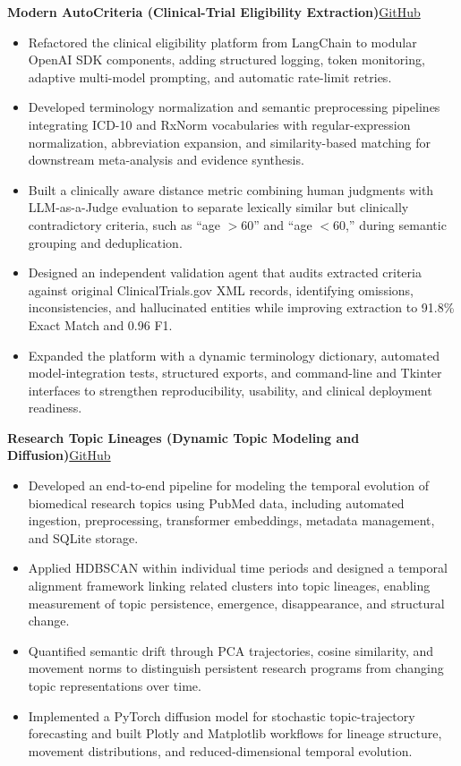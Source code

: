 \documentclass[11pt]{article}
\newcommand{\projectentry}[2]{%
  \Needspace{8\baselineskip}%
  \textbf{#1}\hfill #2\\[-8pt]%
}
\newenvironment{tightitemize}{%
  \vspace{-2pt}%
  \begin{itemize}[leftmargin=*,topsep=0pt,itemsep=1pt,parsep=0pt,partopsep=0pt]
}{%
  \end{itemize}\vspace{4pt}
}
\begin{document}
\projectentry
{Modern AutoCriteria (Clinical-Trial Eligibility Extraction)}
{\href{https://github.com/JonathanMa03/modern-autocrit}{GitHub}}
\begin{tightitemize}
\item Refactored the clinical eligibility platform from LangChain to modular OpenAI SDK components, adding structured logging, token monitoring, adaptive multi-model prompting, and automatic rate-limit retries.
\item Developed terminology normalization and semantic preprocessing pipelines integrating ICD-10 and RxNorm vocabularies with regular-expression normalization, abbreviation expansion, and similarity-based matching for downstream meta-analysis and evidence synthesis.
\item Built a clinically aware distance metric combining human judgments with LLM-as-a-Judge evaluation to separate lexically similar but clinically contradictory criteria, such as ``age $>60$'' and ``age $<60$,'' during semantic grouping and deduplication.
\item Designed an independent validation agent that audits extracted criteria against original ClinicalTrials.gov XML records, identifying omissions, inconsistencies, and hallucinated entities while improving extraction to 91.8\% Exact Match and 0.96 F1.
\item Expanded the platform with a dynamic terminology dictionary, automated model-integration tests, structured exports, and command-line and Tkinter interfaces to strengthen reproducibility, usability, and clinical deployment readiness.
\end{tightitemize}

\projectentry
{Research Topic Lineages (Dynamic Topic Modeling and Diffusion)}
{\href{https://github.com/JonathanMa03/diffusion-topic-evaluation}{GitHub}}
\begin{tightitemize}
\item Developed an end-to-end pipeline for modeling the temporal evolution of biomedical research topics using PubMed data, including automated ingestion, preprocessing, transformer embeddings, metadata management, and SQLite storage.
\item Applied HDBSCAN within individual time periods and designed a temporal alignment framework linking related clusters into topic lineages, enabling measurement of topic persistence, emergence, disappearance, and structural change.
\item Quantified semantic drift through PCA trajectories, cosine similarity, and movement norms to distinguish persistent research programs from changing topic representations over time.
\item Implemented a PyTorch diffusion model for stochastic topic-trajectory forecasting and built Plotly and Matplotlib workflows for lineage structure, movement distributions, and reduced-dimensional temporal evolution.
\end{tightitemize}
\end{document}
